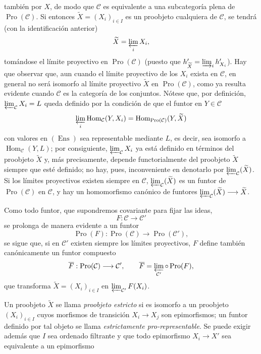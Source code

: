 también por $X$, de modo que $\mathcal C$ es equivalente a una subcategoría
plena de $\operatorname{Pro}(\mathcal C)$. Si entonces
$\widetilde X=(X_i)_{i\in I}$ es un proobjeto cualquiera de $\mathcal C$, se
tendrá (con la identificación anterior)
\[
  \widetilde X=\varprojlim_i X_i,
\]
tomándose el límite proyectivo en $\operatorname{Pro}(\mathcal C)$
(puesto que $h'_{\widetilde X}=\varinjlim_i h'_{X_i}$). Hay que observar que,
aun cuando el límite proyectivo de los $X_i$ exista en $\mathcal C$, en
general no será isomorfo al límite proyectivo $\widetilde X$ en
$\operatorname{Pro}(\mathcal C)$, como ya resulta evidente cuando $\mathcal C$
es la categoría de los conjuntos. Nótese que, por definición,
$\varprojlim_{\mathcal C}X_i=L$ queda definido por la condición de que el
funtor en $Y\in\mathcal C$
\[
  \varprojlim_i\operatorname{Hom}_{\mathcal C}(Y,X_i)
  =\operatorname{Hom}_{\operatorname{Pro}(\mathcal C)}(Y,\widetilde X)
\]
con valores en $(\operatorname{Ens})$ sea representable mediante $L$, es decir,
sea isomorfo a $\operatorname{Hom}_{\mathcal C}(Y,L)$; por consiguiente,
$\varprojlim_{\mathcal C}X_i$ ya está definido en términos del proobjeto
$\widetilde X$ y, más precisamente, depende functorialmente del proobjeto
$\widetilde X$ siempre que esté definido; no hay, pues, inconveniente en
denotarlo por $\varprojlim_{\mathcal C}(\widetilde X)$. Si los límites
proyectivos existen siempre en $\mathcal C$,
$\varprojlim_{\mathcal C}(\widetilde X)$ es un funtor de
$\operatorname{Pro}(\mathcal C)$ en $\mathcal C$, y hay un homomorfismo
canónico de funtores
$\varprojlim_{\mathcal C}(\widetilde X)\longrightarrow\widetilde X$.

Como todo funtor, que supondremos covariante para fijar las ideas,
\[
  F:\mathcal C\longrightarrow\mathcal C'
\]
se prolonga de manera evidente a un funtor
\[
  \operatorname{Pro}(F):\operatorname{Pro}(\mathcal C)
  \longrightarrow\operatorname{Pro}(\mathcal C'),
\]
se sigue que, si en $\mathcal C'$ existen siempre los límites proyectivos, $F$
define también canónicamente un funtor compuesto
\[
  \overline F:\operatorname{Pro}(\mathcal C)\longrightarrow\mathcal C',
  \qquad
  \overline F=\varprojlim_{\mathcal C'}\circ\operatorname{Pro}(F),
\]
que transforma $\widetilde X=(X_i)_{i\in I}$ en
$\varprojlim_{\mathcal C'}F(X_i)$.

Un proobjeto $\widetilde X$ se llama \emph{proobjeto estricto} si es isomorfo a
un proobjeto $(X_i)_{i\in I}$ cuyos morfismos de transición
$X_i\longrightarrow X_j$ son epimorfismos; un funtor definido por tal objeto se
llama \emph{estrictamente pro-representable}. Se puede exigir además que $I$
sea ordenado filtrante y que todo epimorfismo $X_i\longrightarrow X'$ sea
equivalente a un epimorfismo

